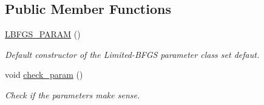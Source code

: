 \subsection*{Public Member Functions}
\begin{DoxyCompactItemize}
\item 
\mbox{\hyperlink{classforte_1_1_l_b_f_g_s___p_a_r_a_m_a65811f626250bb99c51c0283904db95d}{L\+B\+F\+G\+S\+\_\+\+P\+A\+R\+AM}} ()
\begin{DoxyCompactList}\small\item\em Default constructor of the Limited-\/\+B\+F\+GS parameter class set defaut. \end{DoxyCompactList}\item 
void \mbox{\hyperlink{classforte_1_1_l_b_f_g_s___p_a_r_a_m_a41b9a49bbeb64924c317ee23385b3744}{check\+\_\+param}} ()
\begin{DoxyCompactList}\small\item\em Check if the parameters make sense. \end{DoxyCompactList}\end{DoxyCompactItemize}
